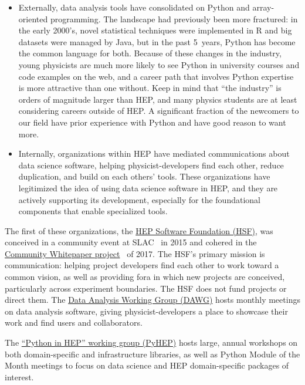 \documentclass{article}
\begin{document}
\begin{itemize}
\item Externally, data analysis tools have consolidated on Python and array-oriented programming. The landscape had previously been more fractured: in the early 2000's, novel statistical techniques were implemented in R and big datasets were managed by Java, but in the past 5~years, Python has become the common language for both. Because of these changes in the industry, young physicists are much more likely to see Python in university courses and code examples on the web, and a career path that involves Python expertise is more attractive than one without. Keep in mind that ``the industry'' is orders of magnitude larger than HEP, and many physics students are at least considering careers outside of HEP. A significant fraction of the newcomers to our field have prior experience with Python and have good reason to want more.

\item Internally, organizations within HEP have mediated communications about data science software, helping physicist-developers find each other, reduce duplication, and build on each others' tools. These organizations have legitimized the idea of using data science software in HEP, and they are actively supporting its development, especially for the foundational components that enable specialized tools.
\end{itemize}

The first of these organizations, the \href{https://hepsoftwarefoundation.org/}{HEP Software Foundation (HSF)}, was conceived in a community event at SLAC~\cite{hsf-workshop-slac2015} in 2015 and cohered in the \href{https://hepsoftwarefoundation.org/organization/cwp.html}{Community Whitepaper project}~\cite{Albrecht2019} of 2017. The HSF's primary mission is communication: helping project developers find each other to work toward a common vision, as well as providing fora in which new projects are conceived, particularly across experiment boundaries. The HSF does not fund projects or direct them. The \href{https://hepsoftwarefoundation.org/workinggroups/dataanalysis.html}{Data Analysis Working Group (DAWG)} hosts monthly meetings on data analysis software, giving physicist-developers a place to showcase their work and find users and collaborators.

The \href{https://hepsoftwarefoundation.org/workinggroups/pyhep.html}{``Python in HEP'' working group (PyHEP)} hosts large, annual workshops on both domain-specific and infrastructure libraries, as well as Python Module of the Month meetings to focus on data science and HEP domain-specific packages of interest.
\end{document}
